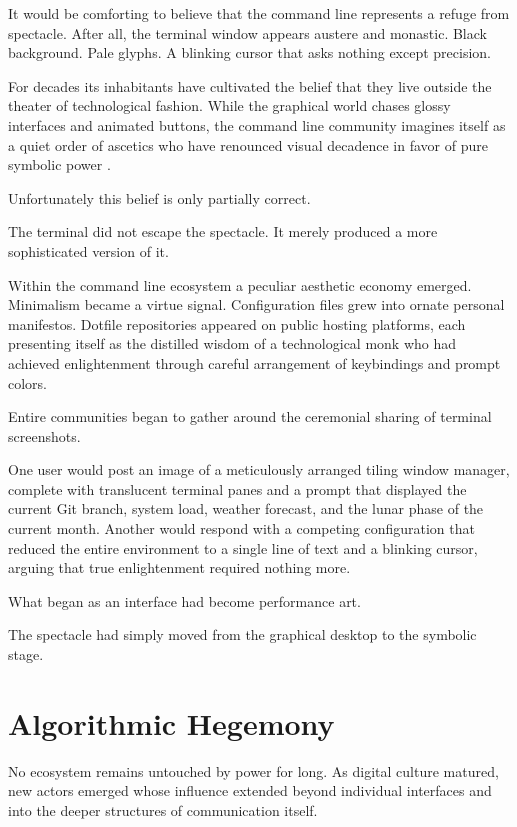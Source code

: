 \documentclass[12pt]{article}
\theoremstyle{definition}
\begin{document}
It would be comforting to believe that the command line represents a
refuge from spectacle. After all, the terminal window appears austere
and monastic. Black background. Pale glyphs. A blinking cursor that
asks nothing except precision.

For decades its inhabitants have cultivated the belief that they live
outside the theater of technological fashion. While the graphical world
chases glossy interfaces and animated buttons, the command line community
imagines itself as a quiet order of ascetics who have renounced visual
decadence in favor of pure symbolic power \cite{raymond2003}.

Unfortunately this belief is only partially correct.

The terminal did not escape the spectacle. It merely produced a more
sophisticated version of it.

Within the command line ecosystem a peculiar aesthetic economy emerged.
Minimalism became a virtue signal. Configuration files grew into ornate
personal manifestos. Dotfile repositories appeared on public hosting
platforms, each presenting itself as the distilled wisdom of a
technological monk who had achieved enlightenment through careful
arrangement of keybindings and prompt colors.

Entire communities began to gather around the ceremonial sharing of
terminal screenshots.

One user would post an image of a meticulously arranged tiling window
manager, complete with translucent terminal panes and a prompt that
displayed the current Git branch, system load, weather forecast, and
the lunar phase of the current month. Another would respond with a
competing configuration that reduced the entire environment to a single
line of text and a blinking cursor, arguing that true enlightenment
required nothing more.

What began as an interface had become performance art.

The spectacle had simply moved from the graphical desktop to the symbolic
stage.

\section{Algorithmic Hegemony}

No ecosystem remains untouched by power for long. As digital culture
matured, new actors emerged whose influence extended beyond individual
interfaces and into the deeper structures of communication itself.
\end{document}
